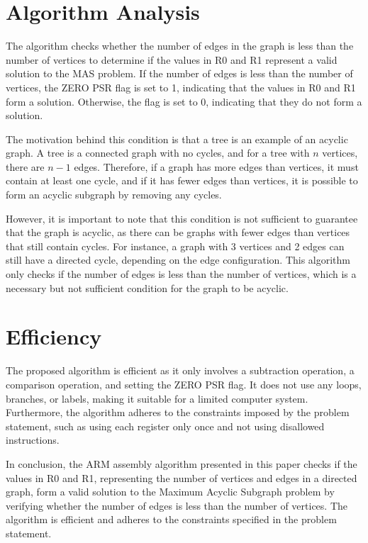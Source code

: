 \section{Algorithm Analysis}

The algorithm checks whether the number of edges in the graph is less than the number of vertices to determine if the values in R0 and R1 represent a valid solution to the MAS problem. If the number of edges is less than the number of vertices, the ZERO PSR flag is set to 1, indicating that the values in R0 and R1 form a solution. Otherwise, the flag is set to 0, indicating that they do not form a solution.

The motivation behind this condition is that a tree is an example of an acyclic graph. A tree is a connected graph with no cycles, and for a tree with $n$ vertices, there are $n - 1$ edges. Therefore, if a graph has more edges than vertices, it must contain at least one cycle, and if it has fewer edges than vertices, it is possible to form an acyclic subgraph by removing any cycles.

However, it is important to note that this condition is not sufficient to guarantee that the graph is acyclic, as there can be graphs with fewer edges than vertices that still contain cycles. For instance, a graph with 3 vertices and 2 edges can still have a directed cycle, depending on the edge configuration. This algorithm only checks if the number of edges is less than the number of vertices, which is a necessary but not sufficient condition for the graph to be acyclic.

\section{Efficiency}

The proposed algorithm is efficient as it only involves a subtraction operation, a comparison operation, and setting the ZERO PSR flag. It does not use any loops, branches, or labels, making it suitable for a limited computer system. Furthermore, the algorithm adheres to the constraints imposed by the problem statement, such as using each register only once and not using disallowed instructions.

In conclusion, the ARM assembly algorithm presented in this paper checks if the values in R0 and R1, representing the number of vertices and edges in a directed graph, form a valid solution to the Maximum Acyclic Subgraph problem by verifying whether the number of edges is less than the number of vertices. The algorithm is efficient and adheres to the constraints specified in the problem statement.



